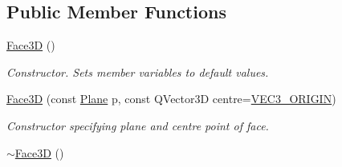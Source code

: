 \subsection*{Public Member Functions}
\begin{DoxyCompactItemize}
\item 
\hypertarget{class_face3_d_af64a4a5fe2a8f06dd684bff91041e0cb}{\hyperlink{class_face3_d_af64a4a5fe2a8f06dd684bff91041e0cb}{Face3\-D} ()}\label{class_face3_d_af64a4a5fe2a8f06dd684bff91041e0cb}

\begin{DoxyCompactList}\small\item\em Constructor. Sets member variables to default values. \end{DoxyCompactList}\item 
\hyperlink{class_face3_d_a6113068475ee9edc57445f8eac3d4f5b}{Face3\-D} (const \hyperlink{class_plane}{Plane} p, const Q\-Vector3\-D centre=\hyperlink{matlib_8h_a58c2465e144af99a0af3108235200f58}{V\-E\-C3\-\_\-\-O\-R\-I\-G\-I\-N})
\begin{DoxyCompactList}\small\item\em Constructor specifying plane and centre point of face. \end{DoxyCompactList}\item 
\hypertarget{class_face3_d_af7dc0f5eb3359689d7617cad7fe65797}{\hyperlink{class_face3_d_af7dc0f5eb3359689d7617cad7fe65797}{$\sim$\-Face3\-D} ()}\label{class_face3_d_af7dc0f5eb3359689d7617cad7fe65797}


\end{DoxyCompactItemize}
